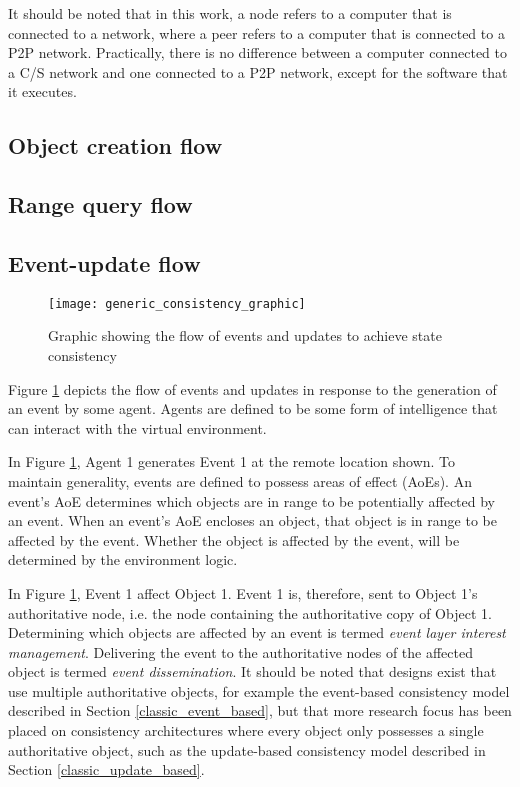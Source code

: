 It should be noted that in this work, a node refers to a computer that is connected to a network, where a peer refers to a computer that is connected to a P2P network. Practically, there is no difference between a computer connected to a C/S network and one connected to a P2P network, except for the software that it executes.

\subsection{Object creation flow}

\subsection{Range query flow}

\subsection{Event-update flow}
\label{general_flow}

\begin{figure}[htbp]
 \centering
 \texttt{[image: generic\_consistency\_graphic]}
 \caption{Graphic showing the flow of events and updates to achieve state consistency}
 \label{fig_event_update_flow_graphic}
\end{figure}

Figure \ref{fig_event_update_flow_graphic} depicts the flow of events and updates in response to the generation of an event by some agent. Agents are defined to be some form of intelligence that can interact with the virtual environment.

In Figure \ref{fig_event_update_flow_graphic}, Agent 1 generates Event 1 at the remote location shown. To maintain generality, events are defined to possess areas of effect (AoEs). An event's AoE determines which objects are in range to be potentially affected by an event. When an event's AoE encloses an object, that object is in range to be affected by the event. Whether the object is affected by the event, will be determined by the environment logic.

In Figure \ref{fig_event_update_flow_graphic}, Event 1 affect Object 1. Event 1 is, therefore, sent to Object 1's authoritative node, i.e. the node containing the authoritative copy of Object 1. Determining which objects are affected by an event is termed \emph{event layer interest management}. Delivering the event to the authoritative nodes of the affected object is termed \emph{event dissemination}. It should be noted that designs exist that use multiple authoritative objects, for example the event-based consistency model described in Section \ref{classic_event_based}, but that more research focus has been placed on consistency architectures where every object only possesses a single authoritative object, such as the update-based consistency model described in Section \ref{classic_update_based}.

